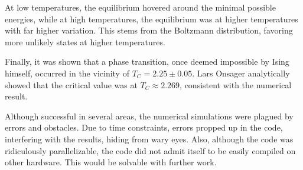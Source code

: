 \documentclass[aps,reprint]{revtex4-1}
\begin{document}
At low temperatures, the equilibrium hovered around the minimal possible
energies, while at high temperatures, the equilibrium was at higher temperatures
with far higher variation. This stems from the Boltzmann distribution, favoring
more unlikely states at higher temperatures.

Finally, it was shown that a phase transition, once deemed impossible by Ising
himself, occurred in the vicinity of \(T_{C} = 2.25\pm 0.05\). Lars Onsager
analytically showed that the critical value was at \(T_{C}\approx 2.269\),
consistent with the numerical result.

Although successful in several areas, the numerical simulations were plagued by
errors and obstacles. Due to time constraints, errors propped up in the code,
interfering with the results, hiding from wary eyes. Also, although the code was
ridiculously parallelizable, the code did not admit itself to be easily compiled
on other hardware. This would be solvable with further work.

\end{document}
